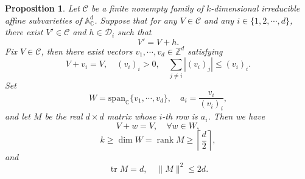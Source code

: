 \documentclass[11pt,reqno]{amsart}
\newcommand\Z{\ensuremath{\mathbb{Z}}}
\newcommand\C{\ensuremath{\mathbb{C}}}
\newtheorem{proposition}[theorem]{Proposition}
\theoremstyle{definition}
\theoremstyle{plain}
\numberwithin{equation}{section}
\begin{document}
\begin{proposition}\label{prop:port-cycle}
    Let $\mathcal{C}$ be a finite nonempty family of $k$-dimensional irreducible affine subvarieties of $\mathbb A^d_{\C}$. Suppose that for any $V\in \mathcal{C}$ and any $i\in \lbrace 1,2,\cdots,d\rbrace$, there exist $V'\in \mathcal{C}$ and $h\in \mathcal{D}_i$ such that
    \begin{equation}\label{eq:port-cycle-edge}
        V'=V+h.
    \end{equation}
    Fix $V\in \mathcal{C}$, then there exist vectors $v_1,\cdots,v_d\in \Z^d$ satisfying
    \begin{equation}\label{eq:port-cycle-stabilizers}
        V+v_i=V, \quad (v_i)_i>0, \quad \sum_{j\neq i}|(v_i)_j|\le (v_i)_i.
    \end{equation}
    Set 
    \begin{equation*}
        W=\mathrm{span}_\C \lbrace v_1,\cdots,v_d \rbrace, \quad a_i=\frac{v_i}{(v_i)_i},
    \end{equation*}
    and let $M$ be the real $d\times d$ matrix whose $i$-th row is $a_i$. Then we have
    \begin{equation}\label{eq:port-cycle-invariance}
        V+w=V,\quad \forall w\in W,
    \end{equation}
    \begin{equation}\label{eq:port-cycle-dimension}
        k\ge \dim W = \operatorname{rank}M\ge \left\lceil \frac{d}{2}\right\rceil,
    \end{equation}
    and
    \begin{equation}\label{eq:port-cycle-matrix-bounds}
        \operatorname{tr}M=d, \quad \|M\|^2\le 2d.
    \end{equation}
\end{proposition}
\end{document}
